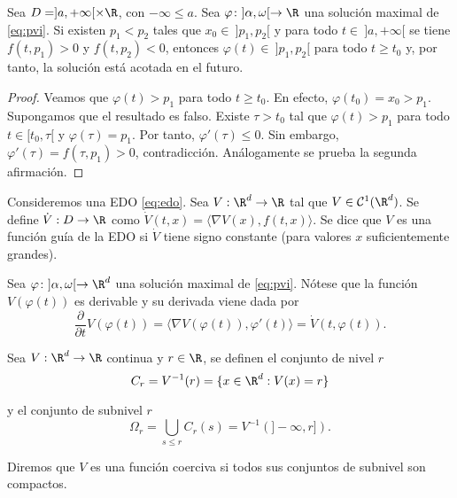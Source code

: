 \documentclass{article}
\begin{document}
\begin{proposition}
  Sea $D = ]a, +\infty[ \times \R$, con $-\infty \le a$. Sea
  $\varphi \colon ]\alpha, \omega[ \to \R$ una solución maximal de \eqref{eq:pvi}. Si existen
  $p_1 < p_2$ tales que $x_0 \in\ ]p_1, p_2[$ y para todo $t \in \ ]a, +\infty[$ se tiene
  $f(t, p_1) > 0$ y $f(t, p_2) < 0$, entonces $\varphi(t) \in \ ]p_1, p_2[$ para todo $t \ge t_0$ y,
  por tanto, la solución está acotada en el futuro.
\end{proposition}
\begin{proof}
  Veamos que $\varphi(t) > p_1$ para todo $t \ge t_0$. En efecto, $\varphi(t_0) = x_0 >
  p_1$. Supongamos que el resultado es falso. Existe $\tau > t_0$ tal que $\varphi(t) > p_1$ para
  todo $t \in [t_0, \tau[$ y $\varphi(\tau) = p_1$. Por tanto, $\varphi'(\tau) \le 0$. Sin embargo,
  $\varphi'(\tau) = f(\tau, p_1) > 0$, contradicción. Análogamente se prueba la segunda afirmación.
\end{proof}

\begin{definition}
  Consideremos una EDO \eqref{eq:edo}.  Sea $V : \R^d \to \R$ tal que $V \in
  \mathcal{C}^1(\R^d)$. Se define $\dot{V}: D \to \R$ como
  $\dot{V}(t,x) = \langle \nabla V(x), f(t,x)\rangle$.  Se dice que $V$ es una función guía de la
  EDO si $\dot{V}$ tiene signo constante (para valores $x$ suficientemente grandes).
\end{definition}

Sea $\varphi \colon ]\alpha, \omega[ \to \R^d$ una solución maximal de \eqref{eq:pvi}. Nótese que la
función $V(\varphi(t))$ es derivable y su derivada viene dada por
\[ \frac{\partial}{\partial t} V(\varphi(t)) = \langle \nabla V(\varphi(t)), \varphi'(t)\rangle =
  \dot{V}(t, \varphi(t)). \]


\begin{definition}
  Sea $V: \R^d \to \R$ continua y $r \in \R$, se definen el conjunto de nivel $r$
  \[C_r = V^{-1}(r) = \{x \in \R^d: V(x) = r\}\]

  y el conjunto de subnivel $r$
  \[\Omega_r = \bigcup_{s \le r} C_r(s) = V^{-1}(]-\infty,r]).\]

  Diremos que $V$ es una función coerciva si todos sus conjuntos de subnivel son compactos.
\end{definition}
\end{document}
